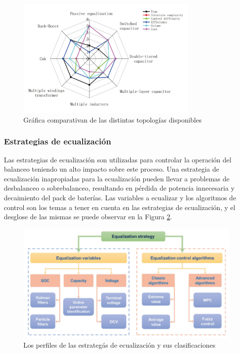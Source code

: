 \documentclass[10pt,a4paper]{article}
\begin{document}
\begin{figure}[h!]
    \begin{center}
        \includegraphics[width=0.8\textwidth]{comp_eq_chart.png}
        \caption{Gr\'afica comparativan de las distintas topolog\'ias disponibles}
        \label{comp_bal_results}
    \end{center}
\end{figure}
\subsubsection{Estrategias de ecualizaci\'on}

Las estrategias de ecualizaci\'on son utilizadas para controlar la operaci\'on
del balanceo teniendo un alto impacto sobre este proceso. Una estrategia de 
ecualizaci\'on inapropiadas para la ecualizaci\'on pueden llevar a problemas de 
desbalanceo o sobrebalanceo, resultando en p\'erdida de potencia innecesaria y 
decaimiento del pack de bater\'ias. Las variables a ecualizar y los algoritmos 
de control son los temas a tener en cuenta en las estrategias de ecualizaci\'on, 
y el desglose de las mismas se puede observar en la Figura 
\ref{eq_strategy_class}.

\begin{figure}[h!]
    \begin{center}
        \includegraphics[width=.8\textwidth]{eq_strategy_class.png}
        \caption{Los perfiles de las estrateg\'as de ecualizaci\'on y sus
                 clasificaciones}
        \label{eq_strategy_class}
    \end{center}
\end{figure}
\end{document}
